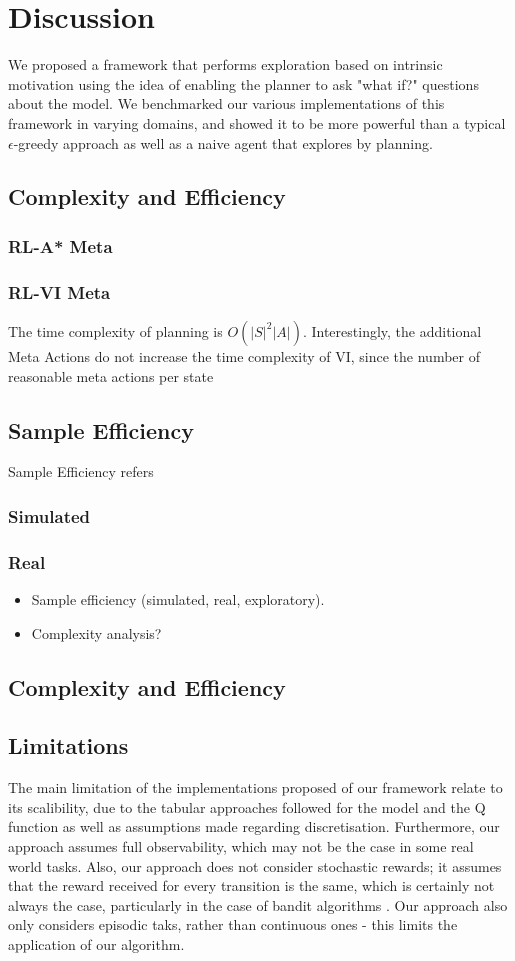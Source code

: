 \chapter{Discussion}
\label{chapter5}

We proposed a framework that performs exploration based on intrinsic motivation using the idea of enabling the planner to ask "what if?" questions about the model. We benchmarked our various implementations of this framework in varying domains, and showed it to be more powerful than a typical $\epsilon$-greedy approach as well as a naive agent that explores by planning.


\section{Complexity and Efficiency}
\subsection{RL-A* Meta}
\subsection{RL-VI Meta}
The time complexity of planning is $O(|S|^2|A|)$. Interestingly, the additional Meta Actions do not increase the time complexity of VI, since the number of reasonable meta actions per state 

\section{Sample Efficiency}
Sample Efficiency refers 
\subsection{Simulated}
\subsection{Real}
\begin{itemize}
    \item Sample efficiency (simulated, real, exploratory).
    \item Complexity analysis?
\end{itemize}
\section{Complexity and Efficiency}
\section{Limitations}
The main limitation of the implementations proposed of our framework relate to its scalibility, due to the tabular approaches followed for the model and the Q function as well as assumptions made regarding discretisation. Furthermore, our approach assumes full observability, which may not be the case in some real world tasks. Also, our approach does not consider stochastic rewards; it assumes that the reward received for every transition is the same, which is certainly not always the case, particularly in the case of bandit algorithms \citep{lattimore}. Our approach also only considers episodic taks, rather than continuous ones - this limits the application of our algorithm.
